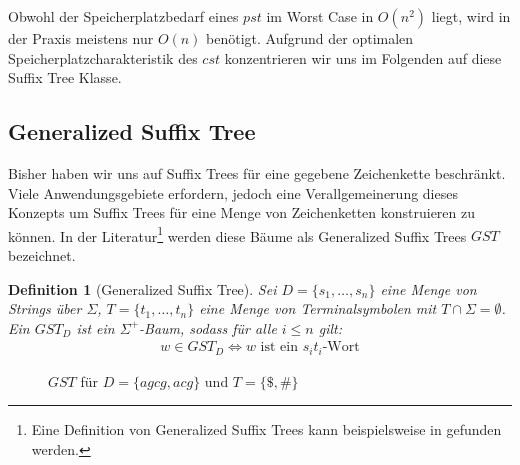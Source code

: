 \documentclass[12pt]{report}
\newtheorem{definition}{Definition}
\begin{document}
Obwohl der Speicherplatzbedarf eines $pst$ im Worst Case in $O(n^2)$ liegt, wird in der Praxis meistens nur $O(n)$ benötigt.
Aufgrund der optimalen Speicherplatzcharakteristik des $cst$ konzentrieren wir uns im Folgenden auf diese Suffix Tree Klasse.

\subsection{Generalized Suffix Tree}
\label{sec:GeneralizedSuffixTree}

Bisher haben wir uns auf Suffix Trees für eine gegebene Zeichenkette beschränkt. Viele Anwendungsgebiete erfordern, jedoch eine Verallgemeinerung dieses Konzepts um Suffix Trees für eine Menge von Zeichenketten konstruieren zu können. In der Literatur\footnote{Eine Definition von Generalized Suffix Trees kann beispielsweise in \cite{Gusfield1997} gefunden werden.} werden diese Bäume als Generalized Suffix Trees $GST$ bezeichnet.

\begin{definition}[Generalized Suffix Tree]
Sei $D = \{s_1, \dots, s_n\}$ eine Menge von Strings über $\Sigma$, $T = \{t_1, \dots, t_n\}$ eine Menge von Terminalsymbolen mit $T \cap \Sigma = \emptyset$. Ein $GST_D$ ist ein $\Sigma^+$-Baum, sodass für alle $i \leq n$ gilt:
\begin{gather*}
    w \in GST_D \Longleftrightarrow w \text{ ist ein } s_it_i\text{-Wort}
\end{gather*}
\label{def:GeneralizedSuffixTree}
\end{definition}

\begin{figure}[htb]
\centering
{}
\caption{$GST$ für $D = \{agcg, acg\}$ und $T = \{\$, \#\}$}
\label{fig:GSTAgcgAcg}
\end{figure}
\end{document}
